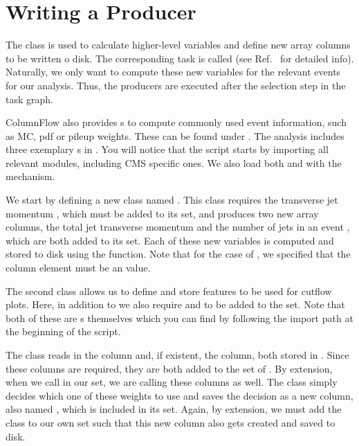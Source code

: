 \section{Writing a Producer}\label{sec:producer}

The  class is used to calculate higher-level variables and define new array columns to be written o disk. The corresponding task is called  (see Ref.~\cite{cf_repo} for detailed info). Naturally, we only want to compute these new variables for the relevant events for our analysis. Thus, the producers are executed after the selection step in the task graph. 

ColumnFlow also provides s to compute commonly used event information, such as MC, pdf or pileup weights. These can be found under . The  analysis includes three exemplary s in . You will notice that the script starts by importing all relevant modules, including CMS specific ones. We also load both  and  with the  mechanism.

We start by defining a new  class named . This class requires the transverse jet momentum , which must be added to its  set, and produces two new array columns, the total jet transverse momentum  and the number of jets in an event , which are both added to its  set. Each of these new variables is computed and stored to disk using the  function. Note that for the case of , we specified that the column element must be an  value.

The second  class  allows us to define and store features to be used for cutflow plots. Here, in addition to  we also require  and  to be added to the  set. Note that both of these are s themselves which you can find by following the import path at the beginning of the script. 

The   class  reads in the  column and, if existent, the  column, both stored in . Since these columns are required, they are both added to the  set of . By extension, when we call  in our  set, we are calling these columns as well. The  class simply decides which one of these weights to use and saves the decision as a new column, also named , which is included in its  set. Again, by extension, we must add the  class to our own  set such that this new column also gets created and saved to disk. 

